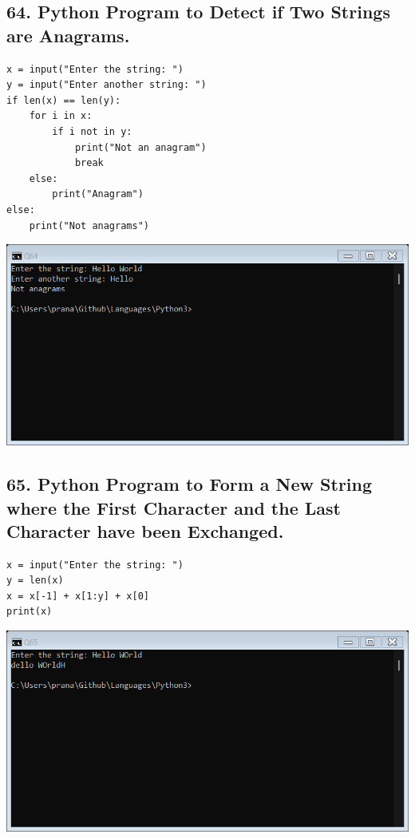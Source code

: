 \documentclass[12pt]{article}
\begin{document}
\subsection*{64. Python Program to Detect if Two Strings are Anagrams.}
\begin{verbatim}
x = input("Enter the string: ")
y = input("Enter another string: ")
if len(x) == len(y):
    for i in x:
        if i not in y:
            print("Not an anagram")
            break
    else:
        print("Anagram")
else:
    print("Not anagrams")
\end{verbatim}
\includegraphics[width=\linewidth]{images/64.png}

\subsection*{65. Python Program to Form a New String where the First Character and the Last Character have been Exchanged.}
\begin{verbatim}
x = input("Enter the string: ")
y = len(x)
x = x[-1] + x[1:y] + x[0]
print(x)
\end{verbatim}
\includegraphics[width=\linewidth]{images/65.png}
\end{document}

